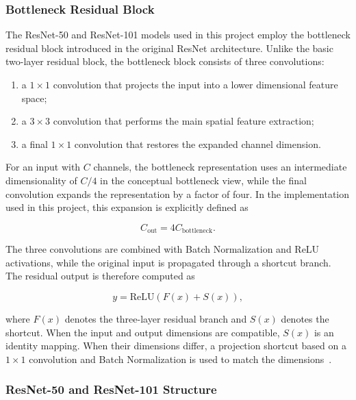 \documentclass[11pt,a4paper]{article}
\begin{document}
\subsubsection{Bottleneck Residual Block}
\label{subsubsec:bottleneck}

The ResNet-50 and ResNet-101 models used in this project employ the
bottleneck residual block introduced in the original ResNet architecture.
Unlike the basic two-layer residual block, the bottleneck block consists of
three convolutions:

\begin{enumerate}
    \item a $1\times1$ convolution that projects the input into a lower
    dimensional feature space;
    \item a $3\times3$ convolution that performs the main spatial feature
    extraction;
    \item a final $1\times1$ convolution that restores the expanded channel
    dimension.
\end{enumerate}

For an input with $C$ channels, the bottleneck representation uses an
intermediate dimensionality of $C/4$ in the conceptual bottleneck view, while
the final convolution expands the representation by a factor of four. In the
implementation used in this project, this expansion is explicitly defined
as

\begin{equation}
C_{\mathrm{out}} = 4C_{\mathrm{bottleneck}}.
\end{equation}

The three convolutions are combined with Batch Normalization and ReLU
activations, while the original input is propagated through a shortcut branch.
The residual output is therefore computed as

\begin{equation}
y = \mathrm{ReLU}\left(F(x) + S(x)\right),
\end{equation}

where $F(x)$ denotes the three-layer residual branch and $S(x)$ denotes the
shortcut. When the input and output dimensions are compatible, $S(x)$ is an
identity mapping. When their dimensions differ, a projection shortcut based
on a $1\times1$ convolution and Batch Normalization is used to match the
dimensions~\cite{he2016resnet}.

\subsubsection{ResNet-50 and ResNet-101 Structure}
\label{subsubsec:resnet_structure}
\end{document}
